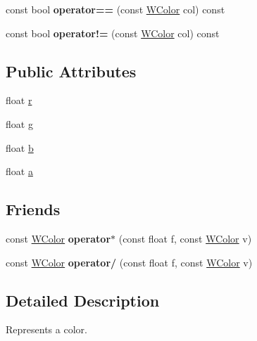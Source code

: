 \begin{DoxyCompactItemize}
\item 
const bool {\bfseries operator==} (const \hyperlink{class_w_color}{W\+Color} col) const \hypertarget{class_w_color_abe6cb73e17d5cdcd032e750c9e0d7251}{}\label{class_w_color_abe6cb73e17d5cdcd032e750c9e0d7251}

\item 
const bool {\bfseries operator!=} (const \hyperlink{class_w_color}{W\+Color} col) const \hypertarget{class_w_color_aa7aa6dbf409555002a28b1ab6d05ef75}{}\label{class_w_color_aa7aa6dbf409555002a28b1ab6d05ef75}

\end{DoxyCompactItemize}
\subsection*{Public Attributes}
\begin{DoxyCompactItemize}
\item 
float \hyperlink{class_w_color_a0bdf6acf580fb1607bed90cb01596444}{r}
\item 
float \hyperlink{class_w_color_aea6616f49cdb611d9a519787a692ce31}{g}
\item 
float \hyperlink{class_w_color_a740e9174ff78cba98a391f6e5b319192}{b}
\item 
float \hyperlink{class_w_color_add453fb03a2f570d04d20458f166b9e0}{a}
\end{DoxyCompactItemize}
\subsection*{Friends}
\begin{DoxyCompactItemize}
\item 
const \hyperlink{class_w_color}{W\+Color} {\bfseries operator$\ast$} (const float f, const \hyperlink{class_w_color}{W\+Color} v)\hypertarget{class_w_color_ac5d19f22943f6c287df4d420dd06cbc5}{}\label{class_w_color_ac5d19f22943f6c287df4d420dd06cbc5}

\item 
const \hyperlink{class_w_color}{W\+Color} {\bfseries operator/} (const float f, const \hyperlink{class_w_color}{W\+Color} v)\hypertarget{class_w_color_a791afa90ccd5a4b4ca8dae450c0478ac}{}\label{class_w_color_a791afa90ccd5a4b4ca8dae450c0478ac}

\end{DoxyCompactItemize}


\subsection{Detailed Description}
Represents a color. 

